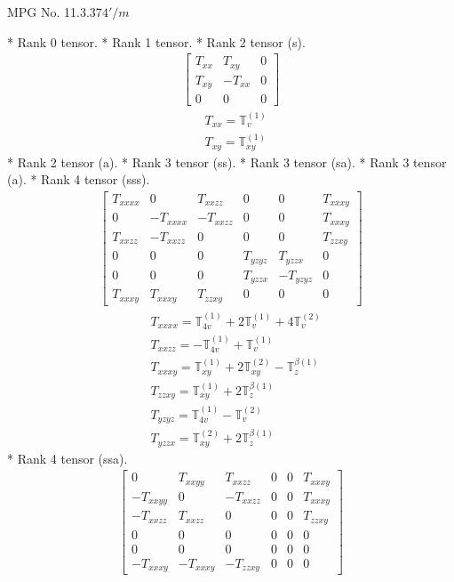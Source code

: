 \documentclass[fleqn,8pt,landscape]{jsarticle}
\begin{document}
\setcounter{MaxMatrixCols}{32}

\renewcommand{\tablename}{Table~}
\renewcommand{\figurename}{Figure~}
\begin{center}
\LARGE
MPG No. 11.3.37\quad$4'/m$
\end{center}
* Rank 0 tensor.
* Rank 1 tensor.
* Rank 2 tensor (s).
\begin{align*}
\begin{bmatrix} T_{xx} & T_{xy} & 0 \\ T_{xy} & - T_{xx} & 0 \\ 0 & 0 & 0 \end{bmatrix}
\end{align*}
\begin{align*}
& T_{xx} = \mathbb{T}_{v}^{(1)} \\
& T_{xy} = \mathbb{T}_{xy}^{(1)}
\end{align*}
* Rank 2 tensor (a).
* Rank 3 tensor (ss).
* Rank 3 tensor (sa).
* Rank 3 tensor (a).
* Rank 4 tensor (sss).
\begin{align*}
\begin{bmatrix} T_{xxxx} & 0 & T_{xxzz} & 0 & 0 & T_{xxxy} \\ 0 & - T_{xxxx} & - T_{xxzz} & 0 & 0 & T_{xxxy} \\ T_{xxzz} & - T_{xxzz} & 0 & 0 & 0 & T_{zzxy} \\ 0 & 0 & 0 & T_{yzyz} & T_{yzzx} & 0 \\ 0 & 0 & 0 & T_{yzzx} & - T_{yzyz} & 0 \\ T_{xxxy} & T_{xxxy} & T_{zzxy} & 0 & 0 & 0 \end{bmatrix}
\end{align*}
\begin{align*}
& T_{xxxx} = \mathbb{T}_{4v}^{(1)} + 2 \mathbb{T}_{v}^{(1)} + 4 \mathbb{T}_{v}^{(2)} \\
& T_{xxzz} = - \mathbb{T}_{4v}^{(1)} + \mathbb{T}_{v}^{(1)} \\
& T_{xxxy} = \mathbb{T}_{xy}^{(1)} + 2 \mathbb{T}_{xy}^{(2)} - \mathbb{T}_{z}^{\beta(1)} \\
& T_{zzxy} = \mathbb{T}_{xy}^{(1)} + 2 \mathbb{T}_{z}^{\beta(1)} \\
& T_{yzyz} = \mathbb{T}_{4v}^{(1)} - \mathbb{T}_{v}^{(2)} \\
& T_{yzzx} = \mathbb{T}_{xy}^{(2)} + 2 \mathbb{T}_{z}^{\beta(1)}
\end{align*}
* Rank 4 tensor (ssa).
\begin{align*}
\begin{bmatrix} 0 & T_{xxyy} & T_{xxzz} & 0 & 0 & T_{xxxy} \\ - T_{xxyy} & 0 & - T_{xxzz} & 0 & 0 & T_{xxxy} \\ - T_{xxzz} & T_{xxzz} & 0 & 0 & 0 & T_{zzxy} \\ 0 & 0 & 0 & 0 & 0 & 0 \\ 0 & 0 & 0 & 0 & 0 & 0 \\ - T_{xxxy} & - T_{xxxy} & - T_{zzxy} & 0 & 0 & 0 \end{bmatrix}
\end{align*}
\end{document}
